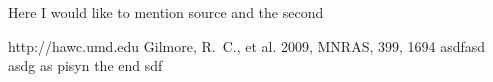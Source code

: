 
Here I would like to mention \cite{hawc} source and the second \cite{gilmore09}

\begin{thebibliography}{00}

 http://hawc.umd.edu
 Gilmore, R.~C., et al. 2009, MNRAS, 399, 1694
 asdfasd asdg as pisyn the end
sdf

\end{thebibliography}


